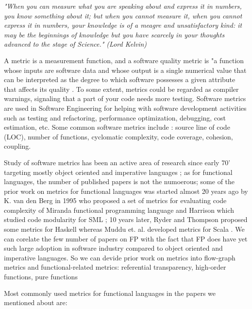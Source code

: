 \documentclass{article}
\begin{document}
\textit{"When you can measure what you are speaking about and express it in numbers, you know something about it; but when you cannot measure it, when you cannot express it in numbers, your knowledge is of a meagre and unsatisfactory kind: it may be the beginnings of knowledge but you have scarcely in your thoughts advanced to the stage of Science." (Lord Kelvin)}\par

A metric is a measurement function, and a software quality metric is "a function whose inputs are software data and whose output is a single numerical value that can be interpreted as the degree to which software possesses a given attribute that affects its quality \cite{Kaner04softwareengineering}. To some extent, metrics could be regarded as compiler warnings, signaling that a part of your code needs more testing. Software metrics are used in Software Engineering for helping with software development activities such as testing and refactoring, performance optimization, debugging, cost estimation, etc. Some common software metrics include : source line of code (LOC), number of functions, cyclomatic complexity, code coverage, cohesion, coupling. \par

Study of software metrics has been an active area of research since early 70' targeting mostly object oriented and imperative languages \cite{RyderT05:TFP_2005_Intellect}; as for functional languages, the number of published papers is not the numoerous; some of the prior work on metrics for functional languages was started almost 20 years ago by K. van den Berg in 1995 \cite{DBLP:journals/infsof/BergB95} who proposed a set of metrics for evaluating code complexity of Miranda functional programming language and Harrison which studied code modularity for SML \cite{eps250597}; 10 years later, Ryder and Thompson proposed some metrics for Haskell \cite{RyderT05:TFP_2005_Intellect} whereas  Muddu et. al. developed metrics for Scala \cite{DBLP:conf/icse/MudduABP13}. We can corelate the few number of papers on FP with the fact that FP does have yet such large adoption in software industry compared to object oriented and imperative languages. So we can devide prior work on metrics into flow-graph metrics and functional-related metrics: referential transparency, high-order functions, pure functions\cite{DBLP:conf/icse/MudduABP13} \par

Most commonly used metrics for functional languages in the papers we mentioned about are:
\end{document}
